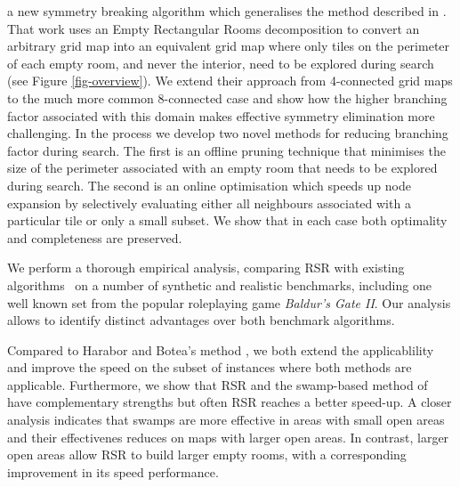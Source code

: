 a new symmetry breaking algorithm which generalises the method described in \cite{harabor10}.
That work uses an Empty Rectangular Rooms decomposition to convert an arbitrary grid map into an
equivalent grid map where only tiles on the perimeter of each empty room, and never the interior, need to be explored
during search (see Figure \ref{fig-overview}).
We extend their approach from 4-connected grid maps to the much more common 8-connected case
and show how the higher branching factor associated 
with this domain makes effective symmetry elimination more challenging.
In the process we develop two novel methods for reducing branching factor during search.
The first is an offline pruning technique that minimises the size of the perimeter associated with an empty room
that needs to be explored during search.
The second is an online optimisation which speeds up node expansion by selectively evaluating either all neighbours
associated with a particular tile or only a small subset.
We show that in each case both optimality and completeness are preserved.

We perform a thorough empirical analysis, comparing RSR with existing algorithms~\cite{pochter10,harabor10}
on a number of synthetic and realistic benchmarks, including one well known set 
from the popular roleplaying game \emph{Baldur's Gate II}.
Our analysis allows to identify distinct advantages over both benchmark algorithms.

%
%
%
Compared to Harabor and Botea's method , 
we both extend the applicablility and improve the speed
on the subset of instances where both methods are applicable.
Furthermore, we show that RSR and the swamp-based method of 
\citeauthor{pochter10}~
have complementary strengths but often RSR reaches a better speed-up.
A closer analysis indicates that swamps are more effective in areas with
small open areas and their effectivenes reduces on maps with larger open areas.
In contrast, larger open areas allow RSR to build larger empty rooms,
with a corresponding improvement in its speed performance.




